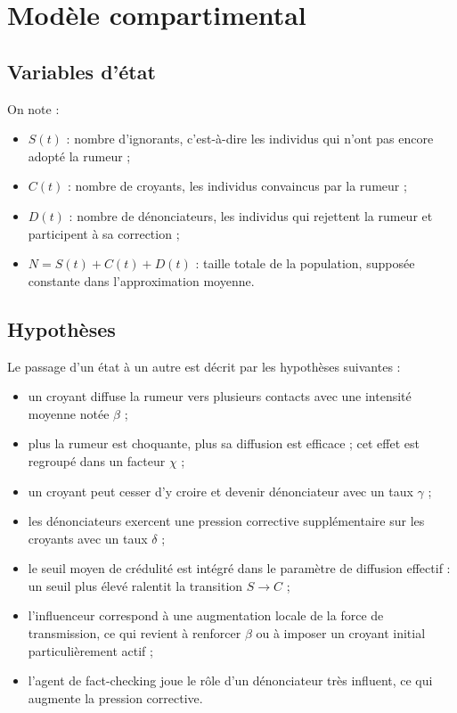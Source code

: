 \documentclass[11pt,a4paper]{article}
\begin{document}
\section{Modèle compartimental}

\subsection{Variables d'état}

On note :

\begin{itemize}
  \item $S(t)$ : nombre d'ignorants, c'est-à-dire les individus qui n'ont pas encore adopté la rumeur ;
  \item $C(t)$ : nombre de croyants, les individus convaincus par la rumeur ;
  \item $D(t)$ : nombre de dénonciateurs, les individus qui rejettent la rumeur et participent à sa correction ;
  \item $N = S(t) + C(t) + D(t)$ : taille totale de la population, supposée constante dans l'approximation moyenne.
\end{itemize}

\subsection{Hypothèses}

Le passage d'un état à un autre est décrit par les hypothèses suivantes :

\begin{itemize}
  \item un croyant diffuse la rumeur vers plusieurs contacts avec une intensité moyenne notée $\beta$ ;
  \item plus la rumeur est choquante, plus sa diffusion est efficace ; cet effet est regroupé dans un facteur $\chi$ ;
  \item un croyant peut cesser d'y croire et devenir dénonciateur avec un taux $\gamma$ ;
  \item les dénonciateurs exercent une pression corrective supplémentaire sur les croyants avec un taux $\delta$ ;
  \item le seuil moyen de crédulité est intégré dans le paramètre de diffusion effectif : un seuil plus élevé ralentit la transition $S \to C$ ;
  \item l'influenceur correspond à une augmentation locale de la force de transmission, ce qui revient à renforcer $\beta$ ou à imposer un croyant initial particulièrement actif ;
  \item l'agent de fact-checking joue le rôle d'un dénonciateur très influent, ce qui augmente la pression corrective.
\end{itemize}
\end{document}

